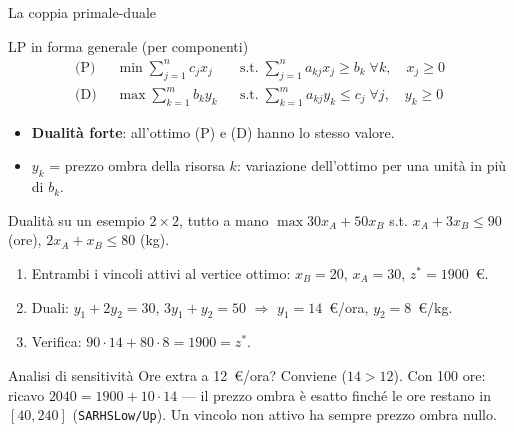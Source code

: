\documentclass[11pt,aspectratio=169]{beamer}
\begin{document}
\begin{frame}{La coppia primale-duale}
\begin{block}{LP in forma generale (per componenti)}
\vspace{-2ex}
\begin{align*}
\text{(P)}\;\; & \min \sum_{j=1}^{n} c_j x_j
&& \text{s.t.}\; \sum_{j=1}^{n} a_{kj} x_j \ge b_k \;\forall k, \quad x_j \ge 0\\
\text{(D)}\;\; & \max \sum_{k=1}^{m} b_k y_k
&& \text{s.t.}\; \sum_{k=1}^{m} a_{kj} y_k \le c_j \;\forall j, \quad y_k \ge 0
\end{align*}
\end{block}
\begin{itemize}
  \item \textbf{Dualità forte}: all'ottimo (P) e (D) hanno lo stesso valore.
  \item $y_k$ = \alert{prezzo ombra} della risorsa $k$: variazione dell'ottimo per
        una unità in più di $b_k$.
\end{itemize}
\end{frame}

\begin{frame}{Dualità su un esempio $2\times 2$, tutto a mano}
$\max 30x_A + 50x_B$ \; s.t. \; $x_A + 3x_B \le 90$ (ore), \; $2x_A + x_B \le 80$ (kg).
\begin{enumerate}
  \item Entrambi i vincoli attivi al vertice ottimo: $x_B = 20$, $x_A = 30$,
        $z^* = 1900$~\euro.
  \item Duali: $y_1 + 2y_2 = 30$, $3y_1 + y_2 = 50$ $\Rightarrow$
        $y_1 = 14$~\euro/ora, $y_2 = 8$~\euro/kg.
  \item Verifica: $90 \cdot 14 + 80 \cdot 8 = 1900 = z^*$. \checkmark
\end{enumerate}
\begin{block}{Analisi di sensitività}
Ore extra a 12~\euro/ora? Conviene ($14 > 12$). Con 100 ore: ricavo $2040 = 1900 +
10 \cdot 14$ --- il prezzo ombra è esatto finché le ore restano in $[40, 240]$
(\texttt{SARHSLow/Up}). Un vincolo non attivo ha sempre prezzo ombra nullo.
\end{block}
\end{frame}
\end{document}
